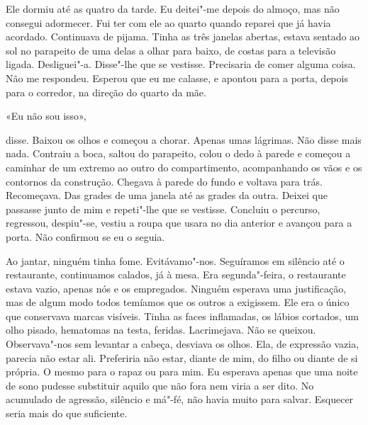 Ele dormiu até as quatro da tarde. Eu deitei"-me depois do almoço, mas
não consegui adormecer. Fui ter com ele ao quarto quando reparei que já
havia acordado. Continuava de pijama. Tinha as três janelas abertas,
estava sentado ao sol no parapeito de uma delas a olhar para baixo, de
costas para a televisão ligada. Desliguei"-a. Disse"-lhe que se
vestisse. Precisaria de comer alguma coisa. Não me respondeu. Esperou
que eu me calasse, e apontou para a porta, depois para o corredor, na
direção do quarto da mãe.

«Eu não sou isso»,

disse. Baixou os olhos e começou a chorar. Apenas umas lágrimas. Não
disse mais nada. Contraiu a boca, saltou do parapeito, colou o dedo à
parede e começou a caminhar de um extremo ao outro do compartimento,
acompanhando os vãos e os contornos da construção. Chegava à parede do
fundo e voltava para trás. Recomeçava. Das grades de uma janela até as
grades da outra. Deixei que passasse junto de mim e repeti"-lhe que se
vestisse. Concluiu o percurso, regressou, despiu"-se, vestiu a roupa que
usara no dia anterior e avançou para a porta. Não confirmou se eu o
seguia.

Ao jantar, ninguém tinha fome. Evitávamo"-nos. Seguíramos em silêncio
até o restaurante, continuamos calados, já à mesa. Era segunda"-feira,
o restaurante estava vazio, apenas nós e os empregados. Ninguém esperava
uma justificação, mas de algum modo todos temíamos que os outros a
exigissem. Ele era o único que conservava marcas visíveis. Tinha as
faces inflamadas, os lábios cortados, um olho pisado, hematomas na
testa, feridas. Lacrimejava. Não se queixou. Observava"-nos sem levantar
a cabeça, desviava os olhos. Ela, de expressão vazia, parecia não estar
ali. Preferiria não estar, diante de mim, do filho ou diante de si
própria. O mesmo para o rapaz ou para mim. Eu esperava apenas que uma
noite de sono pudesse substituir aquilo que não fora nem viria a ser
dito. No acumulado de agressão, silêncio e má"-fé, não havia muito para
salvar. Esquecer seria mais do que suficiente.

